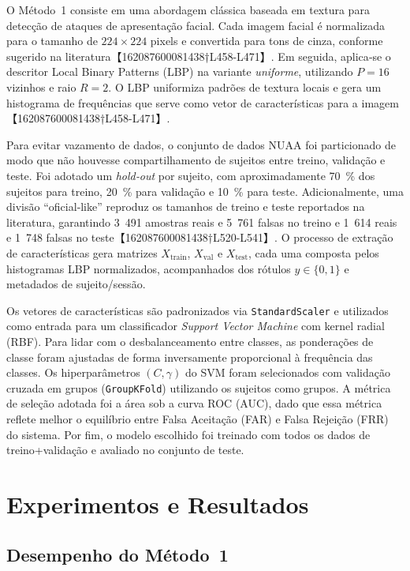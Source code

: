 \documentclass[
    article,
    11pt,
    oneside,
    a4paper,
    english,
    brazil,
    sumario=tradicional
]{abntex2}
\begin{document}
O Método 1 consiste em uma abordagem clássica baseada em textura para detecção de ataques de apresentação facial. Cada imagem facial é normalizada para o tamanho de $224\times224$ pixels e convertida para tons de cinza, conforme sugerido na literatura【162087600081438†L458-L471】. Em seguida, aplica‑se o descritor Local Binary Patterns (LBP) na variante \emph{uniforme}, utilizando $P=16$ vizinhos e raio $R=2$. O LBP uniformiza padrões de textura locais e gera um histograma de frequências que serve como vetor de características para a imagem【162087600081438†L458-L471】.

Para evitar vazamento de dados, o conjunto de dados NUAA foi particionado de modo que não houvesse compartilhamento de sujeitos entre treino, validação e teste. Foi adotado um \emph{hold‑out} por sujeito, com aproximadamente 70 \% dos sujeitos para treino, 20 \% para validação e 10 \% para teste. Adicionalmente, uma divisão “oficial‑like” reproduz os tamanhos de treino e teste reportados na literatura, garantindo 3 491 amostras reais e 5 761 falsas no treino e 1 614 reais e 1 748 falsas no teste【162087600081438†L520-L541】. O processo de extração de características gera matrizes $X_{\mathrm{train}}$, $X_{\mathrm{val}}$ e $X_{\mathrm{test}}$, cada uma composta pelos histogramas LBP normalizados, acompanhados dos rótulos $y\in\{0,1\}$ e metadados de sujeito/sessão.

Os vetores de características são padronizados via \texttt{StandardScaler} e utilizados como entrada para um classificador \textit{Support Vector Machine} com kernel radial (RBF). Para lidar com o desbalanceamento entre classes, as ponderações de classe foram ajustadas de forma inversamente proporcional à frequência das classes. Os hiperparâmetros $(C,\gamma)$ do SVM foram selecionados com validação cruzada em grupos (\texttt{GroupKFold}) utilizando os sujeitos como grupos. A métrica de seleção adotada foi a área sob a curva ROC (AUC), dado que essa métrica reflete melhor o equilíbrio entre Falsa Aceitação (FAR) e Falsa Rejeição (FRR) do sistema. Por fim, o modelo escolhido foi treinado com todos os dados de treino+validação e avaliado no conjunto de teste.

\section{Experimentos e Resultados}

\subsection{Desempenho do Método 1}
\end{document}

